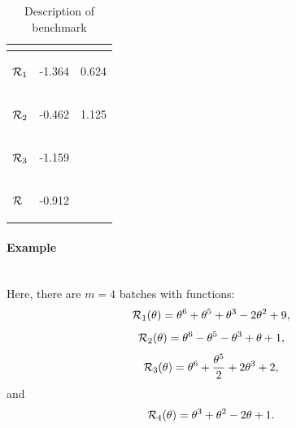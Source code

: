 \begin{table}[h!]
	\centering
	\caption{Description of benchmark \exSeven}
	\begin{tabular}{lll}
		
		\toprule
		\begin{bf} \diagbox{Functions}{Minimums} \end{bf} & \begin{bf}\mg\end{bf} & \begin{bf}\ml\end{bf} \\
		\midrule
		
		\begin{bf}$\mathcal{R}_1$\end{bf} & -1.364 & 0.624  \\ \midrule
		\begin{bf}$\mathcal{R}_2$\end{bf} & -0.462 & 1.125 \\ \midrule
		\begin{bf}$\mathcal{R}_3$\end{bf} & -1.159 &  \\ \midrule
		\begin{bf}$\mathcal{R}$\end{bf}   & -0.912 &   \\ \bottomrule
	\end{tabular}
	\label{ex7_example}
\end{table}

\paragraph{Example \exHeight}
~~\\

Here, there are $m=4$ batches with functions:
\begin{equation*}
	\mathcal{R}_1(\theta) = \theta^6+\theta^5+\theta^3-2\theta^2+9,
\end{equation*}
\begin{equation*}
	\mathcal{R}_2(\theta) = \theta^6-\theta^5-\theta^3+\theta+1,
\end{equation*}
\begin{equation*}
	\mathcal{R}_3(\theta) = \theta^6+\frac{\theta^5}{2}+2\theta^3+2,
\end{equation*}
and
\begin{equation*}
	\mathcal{R}_4(\theta) = \theta^3+\theta^2-2\theta+1.
\end{equation*}

